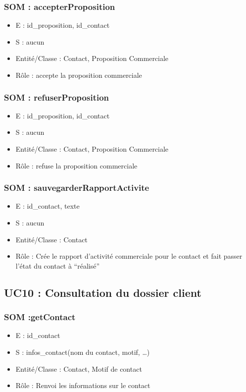 \subsubsection{SOM : accepterProposition}
	\begin{itemize}
		\item E : id\_proposition, id\_contact
		\item S : aucun
		\item Entité/Classe : Contact, Proposition Commerciale
		\item Rôle : accepte la proposition commerciale
	\end{itemize}

\subsubsection{SOM : refuserProposition}
	\begin{itemize}
		\item E : id\_proposition, id\_contact
		\item S : aucun
		\item Entité/Classe : Contact, Proposition Commerciale
		\item Rôle : refuse la proposition commerciale
	\end{itemize}

\subsubsection{SOM : sauvegarderRapportActivite}
	\begin{itemize}
		\item E : id\_contact, texte
		\item S : aucun
		\item Entité/Classe : Contact
		\item Rôle : Crée le rapport d’activité commerciale pour le contact et fait passer l’état du
	contact à “réalisé”
	\end{itemize}



\subsection{UC10 : Consultation du dossier client}

\subsubsection{SOM :getContact}
	\begin{itemize}
		\item E : id\_contact
		\item S : infos\_contact(nom du contact, motif, …)
		\item Entité/Classe : Contact, Motif de contact
		\item Rôle : Renvoi les informations sur le contact
	\end{itemize}


